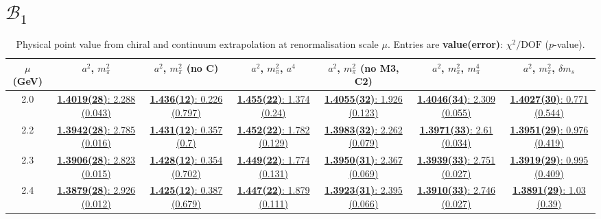 \documentclass[12pt]{extarticle}
\begin{document}
\clearpage
\section{$\mathcal{B}_1$}
\begin{table}[h!]
\begin{center}
\begin{tabular}{|c|c|c|c|c|c|c|}
\hline
$\mu$ (GeV) & $a^2$, $m_\pi^2$& $a^2$, $m_\pi^2$ (no C)& $a^2$, $m_\pi^2$, $a^4$& $a^2$, $m_\pi^2$ (no M3, C2)& $a^2$, $m_\pi^2$, $m_\pi^4$& $a^2$, $m_\pi^2$, $\delta m_s$\\
\hline
2.0& \hyperlink{VVpAA/SUSY/bag_a2m2_20.pdf.1}{\textbf{1.4019(28)}: 2.288 (0.043)} & \hyperlink{VVpAA/SUSY/bag_a2m2noC_20.pdf.1}{\textbf{1.436(12)}: 0.226 (0.797)} & \hyperlink{VVpAA/SUSY/bag_a2a4m2_20.pdf.1}{\textbf{1.455(22)}: 1.374 (0.24)} & \hyperlink{VVpAA/SUSY/bag_a2m2mcut_20.pdf.1}{\textbf{1.4055(32)}: 1.926 (0.123)} & \hyperlink{VVpAA/SUSY/bag_a2m2m4_20.pdf.1}{\textbf{1.4046(34)}: 2.309 (0.055)} & \hyperlink{VVpAA/SUSY/bag_a2m2delm_20.pdf.1}{\textbf{1.4027(30)}: 0.771 (0.544)}\\
2.2& \hyperlink{VVpAA/SUSY/bag_a2m2_22.pdf.1}{\textbf{1.3942(28)}: 2.785 (0.016)} & \hyperlink{VVpAA/SUSY/bag_a2m2noC_22.pdf.1}{\textbf{1.431(12)}: 0.357 (0.7)} & \hyperlink{VVpAA/SUSY/bag_a2a4m2_22.pdf.1}{\textbf{1.452(22)}: 1.782 (0.129)} & \hyperlink{VVpAA/SUSY/bag_a2m2mcut_22.pdf.1}{\textbf{1.3983(32)}: 2.262 (0.079)} & \hyperlink{VVpAA/SUSY/bag_a2m2m4_22.pdf.1}{\textbf{1.3971(33)}: 2.61 (0.034)} & \hyperlink{VVpAA/SUSY/bag_a2m2delm_22.pdf.1}{\textbf{1.3951(29)}: 0.976 (0.419)}\\
2.3& \hyperlink{VVpAA/SUSY/bag_a2m2_23.pdf.1}{\textbf{1.3906(28)}: 2.823 (0.015)} & \hyperlink{VVpAA/SUSY/bag_a2m2noC_23.pdf.1}{\textbf{1.428(12)}: 0.354 (0.702)} & \hyperlink{VVpAA/SUSY/bag_a2a4m2_23.pdf.1}{\textbf{1.449(22)}: 1.774 (0.131)} & \hyperlink{VVpAA/SUSY/bag_a2m2mcut_23.pdf.1}{\textbf{1.3950(31)}: 2.367 (0.069)} & \hyperlink{VVpAA/SUSY/bag_a2m2m4_23.pdf.1}{\textbf{1.3939(33)}: 2.751 (0.027)} & \hyperlink{VVpAA/SUSY/bag_a2m2delm_23.pdf.1}{\textbf{1.3919(29)}: 0.995 (0.409)}\\
2.4& \hyperlink{VVpAA/SUSY/bag_a2m2_24.pdf.1}{\textbf{1.3879(28)}: 2.926 (0.012)} & \hyperlink{VVpAA/SUSY/bag_a2m2noC_24.pdf.1}{\textbf{1.425(12)}: 0.387 (0.679)} & \hyperlink{VVpAA/SUSY/bag_a2a4m2_24.pdf.1}{\textbf{1.447(22)}: 1.879 (0.111)} & \hyperlink{VVpAA/SUSY/bag_a2m2mcut_24.pdf.1}{\textbf{1.3923(31)}: 2.395 (0.066)} & \hyperlink{VVpAA/SUSY/bag_a2m2m4_24.pdf.1}{\textbf{1.3910(33)}: 2.746 (0.027)} & \hyperlink{VVpAA/SUSY/bag_a2m2delm_24.pdf.1}{\textbf{1.3891(29)}: 1.03 (0.39)}\\
\hline
\end{tabular}
\caption{Physical point value from chiral and continuum extrapolation at renormalisation scale $\mu$. Entries are \textbf{value(error)}: $\chi^2/\text{DOF}$ ($p$-value).}
\end{center}
\end{table}
\end{document}
